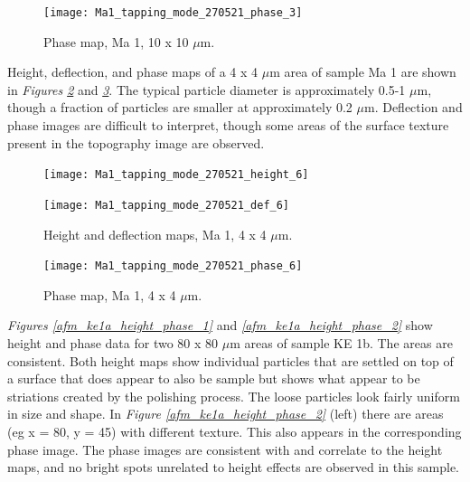 \begin{figure}[H]
\centering
  \texttt{[image: Ma1\_tapping\_mode\_270521\_phase\_3]}
\caption[Phase map, Ma 1]{Phase map, Ma 1, 10 x 10 $\mu$m.}
\label{fig:afm_ma1_phase_4}
\end{figure}

Height, deflection, and phase maps of a 4 x 4 $\mu$m area of sample Ma 1 are shown in \textit{Figures \ref{fig:afm_ma1_height_def_5}} and \textit{\ref{fig:afm_ma1_phase_5}}. The typical particle diameter is approximately 0.5-1 $\mu$m, though a fraction of particles are smaller at approximately 0.2 $\mu$m. Deflection and phase images are difficult to interpret, though some areas of the surface texture present in the topography image are observed.

\begin{figure}[H]
\centering
\begin{minipage}{.45\textwidth}
  \centering
  \texttt{[image: Ma1\_tapping\_mode\_270521\_height\_6]}
\end{minipage}
\begin{minipage}{.45\textwidth}
  \centering
  \texttt{[image: Ma1\_tapping\_mode\_270521\_def\_6]}
\end{minipage}
\caption[Height and deflection maps, Ma 1]{Height and deflection maps, Ma 1, 4 x 4 $\mu$m.}
\label{fig:afm_ma1_height_def_5}
\end{figure}

\begin{figure}[H]
\centering
  \texttt{[image: Ma1\_tapping\_mode\_270521\_phase\_6]}
\caption[Phase map, Ma 1]{Phase map, Ma 1, 4 x 4 $\mu$m.}
\label{fig:afm_ma1_phase_5}
\end{figure}



\textit{Figures \ref{afm_ke1a_height_phase_1}} and \textit{\ref{afm_ke1a_height_phase_2}} show height and phase data for two 80 x 80 $\mu$m areas of sample KE 1b. The areas are consistent. Both height maps show individual particles that are settled on top of a surface that does appear to also be sample but shows what appear to be striations created by the polishing process. The loose particles look fairly uniform in size and shape. In \textit{Figure \ref{afm_ke1a_height_phase_2}} (left) there are areas (eg x = 80, y = 45) with different texture. This also appears in the corresponding phase image. The phase images are consistent with and correlate to the height maps, and no bright spots unrelated to height effects are observed in this sample.


